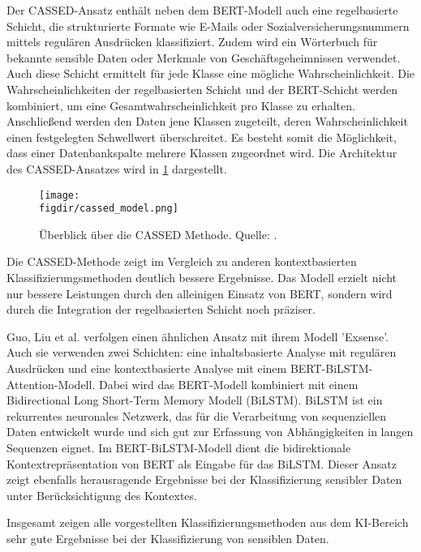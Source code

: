 Der CASSED-Ansatz enthält neben dem BERT-Modell auch eine regelbasierte Schicht, die strukturierte Formate wie E-Mails oder Sozialversicherungsnummern mittels regulären Ausdrücken klassifiziert. Zudem wird ein Wörterbuch für bekannte sensible Daten oder Merkmale von Geschäftsgeheimnissen verwendet. Auch diese Schicht ermittelt für jede Klasse eine mögliche Wahrscheinlichkeit. Die Wahrscheinlichkeiten der regelbasierten Schicht und der BERT-Schicht werden kombiniert, um eine Gesamtwahrscheinlichkeit pro Klasse zu erhalten. Anschließend werden den Daten jene Klassen zugeteilt, deren Wahrscheinlichkeit einen festgelegten Schwellwert überschreitet. Es besteht somit die Möglichkeit, dass einer Datenbankspalte mehrere Klassen zugeordnet wird. Die Architektur des CASSED-Ansatzes wird in \ref{f:cassed} dargestellt.

\begin{figure}[htbp]
    \centering
    \texttt{[image: \\figdir/cassed\_model.png]}
    \caption{Überblick über die CASSED Methode. Quelle: \cite{Kuzina.2023}.}
    \label{f:cassed}
\end{figure}

Die CASSED-Methode zeigt im Vergleich zu anderen kontextbasierten Klassifizierungsmethoden deutlich bessere Ergebnisse. Das Modell erzielt nicht nur bessere Leistungen durch den alleinigen Einsatz von BERT, sondern wird durch die Integration der regelbasierten Schicht noch präziser.

Guo, Liu et al. \cite{Guo.2021} verfolgen einen ähnlichen Ansatz mit ihrem Modell 'Exsense'. Auch sie verwenden zwei Schichten: eine inhaltsbasierte Analyse mit regulären Ausdrücken und eine kontextbasierte Analyse mit einem BERT-BiLSTM-Attention-Modell. Dabei wird das BERT-Modell kombiniert mit einem Bidirectional Long Short-Term Memory Modell (BiLSTM). BiLSTM ist ein rekurrentes neuronales Netzwerk, das für die Verarbeitung von sequenziellen Daten entwickelt wurde und sich gut zur Erfassung von Abhängigkeiten in langen Sequenzen eignet. Im BERT-BiLSTM-Modell dient die bidirektionale Kontextrepräsentation von BERT als Eingabe für das BiLSTM. Dieser Ansatz zeigt ebenfalls herausragende Ergebnisse bei der Klassifizierung sensibler Daten unter Berücksichtigung des Kontextes.

Insgesamt zeigen alle vorgestellten Klassifizierungsmethoden aus dem KI-Bereich sehr gute Ergebnisse bei der Klassifizierung von sensiblen Daten.


